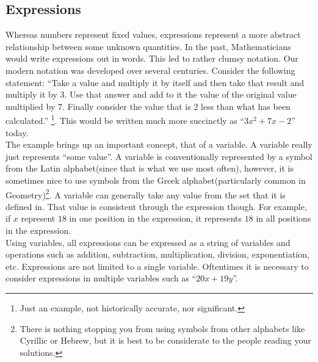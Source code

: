 \documentclass[a4paper,12pt]{article}
\begin{document}
\subsection{Expressions}
Whereas numbers represent fixed values, expressions represent a more abstract relationship between some unknown quantities. In the past, Mathematicians would write expressions out in words. This led to rather clumsy notation. Our modern notation was developed over several centuries. Consider the following statement: ``Take a value and multiply it by itself and then take that result and multiply it by 3. Use that answer and add to it the value of the original value multiplied by 7. Finally consider the value that is 2 less than what has been calculated.'' \footnote{Just an example, not historically accurate, nor significant.}. This would be written much more succinctly as ``$3x^{2} + 7x - 2$'' today. \\

The example brings up an important concept, that of a variable. A variable really just represents ``some value''. A variable is conventionally represented by a symbol from the Latin alphabet(since that is what we use most often), however, it is sometimes nice to use symbols from the Greek alphabet(particularly common in Geometry)\footnote{There is nothing stopping you from using symbols from other alphabets like Cyrillic or Hebrew, but it is best to be considerate to the people reading your solutions.}. A variable can generally take any value from the set that it is defined in. That value is consistent through the expression though. For example, if $x$ represent $18$ in one position in the expression, it represents $18$ in all positions in the expression. \\

Using variables, all expressions can be expressed as a string of variables and operations such as addition, subtraction, multiplication, division, exponentiation, etc. Expressions are not limited to a single variable. Oftentimes it is necessary to consider expressions in multiple variables such as ``$20x + 19y$''. \\
\end{document}
